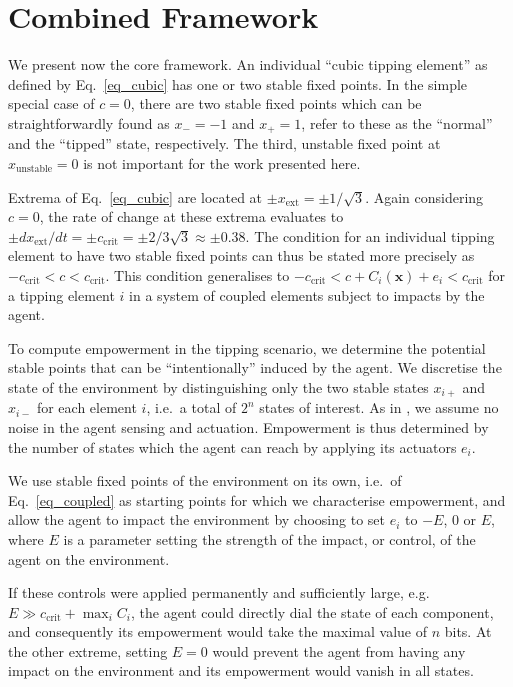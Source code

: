 \documentclass[letterpaper]{article}
\newcommand{\vectorsym}[1]{\ensuremath{\mathbf{#1}}}
\newcommand{\xextremum}{\ensuremath{x_{\mathrm{ext}}}}
\newcommand{\ccrit}{\ensuremath{c_{\mathrm{crit}}}}
\newcommand{\agentimpact}{\ensuremath{e}}
\begin{document}
\section{Combined Framework}
We present now the core framework.
An individual ``cubic tipping element'' as defined by
Eq.~\ref{eq_cubic} has one or two stable fixed points. In the simple
special case of $c = 0$, there are two stable fixed points which can
be straightforwardly found as $x_{-} = -1$ and $x_{+} = 1$,
\citet{Klose2019_interactingtippingelements} refer to these as the
``normal'' and the ``tipped'' state, respectively. The third, unstable
fixed point at $x_{\mathrm{unstable}} = 0$ is not important for the
work presented here.

Extrema of Eq.~\ref{eq_cubic} are located at
$\pm \xextremum = \pm 1 / \sqrt{3}$. Again considering $c = 0$, the
rate of change at these extrema evaluates to
$\pm d\xextremum / dt = \pm \ccrit = \pm 2 / 3\sqrt{3} \approx \pm
0.38$.
The condition for an individual tipping element to have two stable
fixed points can thus be stated more precisely as
$-\ccrit < c < \ccrit$. This condition generalises to
$-\ccrit < c + C_i(\vectorsym{x}) + \agentimpact_i < \ccrit$ for a
tipping element $i$ in a system of coupled elements subject to impacts
by the agent.

To compute empowerment in the tipping scenario, we determine the
potential stable points that can be ``intentionally'' induced by the
agent. We discretise the state of the environment by distinguishing
only the two stable states $x_{i+}$ and $x_{i-}$ for each element $i$,
i.e.\ a total of $2^n$ states of interest. As in
\citep{Kim2009_sustainability}, we assume no noise in the agent
sensing and actuation. Empowerment is thus determined by the number of
states which the agent can reach by applying its actuators
$\agentimpact_i$.

We use stable fixed points of the environment on its own, i.e.\ of
Eq.~\ref{eq_coupled} as starting points for which we characterise
empowerment, and allow the agent to impact the environment by choosing
to set $\agentimpact_i$ to $-E$, $0$ or $E$, where $E$ is a parameter
setting the strength of the impact, or control, of the agent on the
environment.

If these controls were applied permanently and sufficiently large,
e.g. $E \gg \ccrit + \max_i C_i$, the agent could directly dial the
state of each component, and consequently its empowerment would take
the maximal value of $n$ bits. At the other extreme, setting $E = 0$
would prevent the agent from having any impact on the environment and
its empowerment would vanish in all states.
\end{document}
